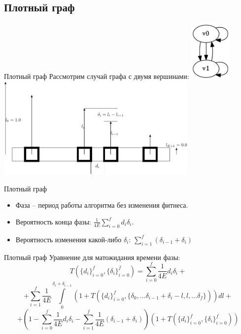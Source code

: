 \documentclass{beamer}
\begin{document}
 \subsection{Плотный граф}
 \begin{frame}{Плотный граф}
  Рассмотрим случай графа с двумя вершинами:
  \includegraphics[height=3cm]{pic/2v_graph.png}
  \includegraphics[height=5cm]{pic/edges.pdf}
 \end{frame}
 
  \begin{frame}{Плотный граф}
  \begin{itemize}
   \item Фаза -- период работы алгоритма без изменения фитнеса.
   \item Вероятность конца фазы: $\frac{1}{4E} \sum_{i = 0}^f d_i \delta_i$.
   \item Вероятность изменения какой-либо $\delta_i$: $\sum_{i = 1}^f (\delta_{i - 1} + \delta_i)$ 
  \end{itemize}
 \end{frame}
 
 \begin{frame}{Плотный граф}
  Уравнение для матожидания времени фазы:
  $$T(\{d_i\}_{i = 0}^f, \{\delta_i\}_{i = 0}^f) =  \sum_{i = 0}^f \frac{1}{4E}d_i \delta_i + $$
  $$ + \sum_{i = 1}^f \frac{1}{4E} \int\limits_{0}^{\delta_i + \delta_{i - 1}} (1 + T(\{d_i\}_{i = 0}^f, \{\delta_0, ... \delta_{i-1} + \delta_i - l, l, ...\delta_f\}) ) dl + $$
  $$ + \left(1 - \sum_{i = 0}^f \frac{1}{4E}d_i \delta_i - \sum_{i = 1}^f \frac{1}{4E}(\delta_{i - 1} + \delta_i) \right)(1 + T(\{d_i\}_{i = 0}^f, \{\delta_i\}_{i = 0}^f))$$
 \end{frame}
 
\end{document}
